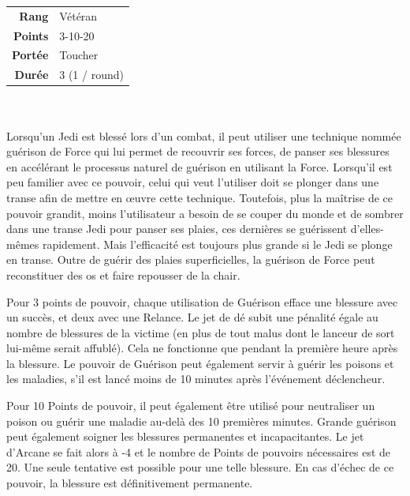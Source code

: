 \begin{description}[align=left]
        \begin{tabular}{ r l }
            \textbf{Rang}    & Vétéran \\
            \textbf{Points}  & 3-10-20 \\
            \textbf{Portée}  & Toucher \\
            \textbf{Durée}   & 3 (1 / round) \\
        \end{tabular}
        \\ \\
        Lorsqu'un Jedi est blessé lors d'un combat, il peut utiliser une technique nommée guérison de Force qui lui permet de recouvrir ses forces, de panser ses blessures en accélérant le processus naturel de guérison en utilisant la Force. Lorsqu'il est peu familier avec ce pouvoir, celui qui veut l'utiliser doit se plonger dans une transe afin de mettre en œuvre cette technique. Toutefois, plus la maîtrise de ce pouvoir grandit, moins l'utilisateur a besoin de se couper du monde et de sombrer dans une transe Jedi pour panser ses plaies, ces dernières se guérissent d'elles-mêmes rapidement. Mais l'efficacité est toujours plus grande si le Jedi se plonge en transe. Outre de guérir des plaies superficielles, la guérison de Force peut reconstituer des os et faire repousser de la chair. 

        Pour 3 points de pouvoir, chaque utilisation de Guérison efface une blessure avec un succès, et deux avec une Relance. Le jet de dé subit une pénalité égale au nombre de blessures de la victime (en plus de tout malus dont le lanceur de sort lui-même serait affublé). Cela ne fonctionne que pendant la première heure après la blessure. Le pouvoir de Guérison peut également servir à guérir les poisons et les maladies, s’il est lancé moins de 10 minutes après l’événement déclencheur.

        Pour 10 Points de pouvoir, il peut également être utilisé pour neutraliser un poison ou guérir une maladie au-delà des 10 premières minutes. Grande guérison peut également soigner les blessures permanentes et incapacitantes. Le jet d’Arcane se fait alors à -4 et le nombre de Points de pouvoirs nécessaires est de 20. Une seule tentative est possible pour une telle blessure. En cas d’échec de ce pouvoir, la blessure est définitivement permanente.
        \\

    \item [Lumière de la Force] ~ \\


\end{description}
